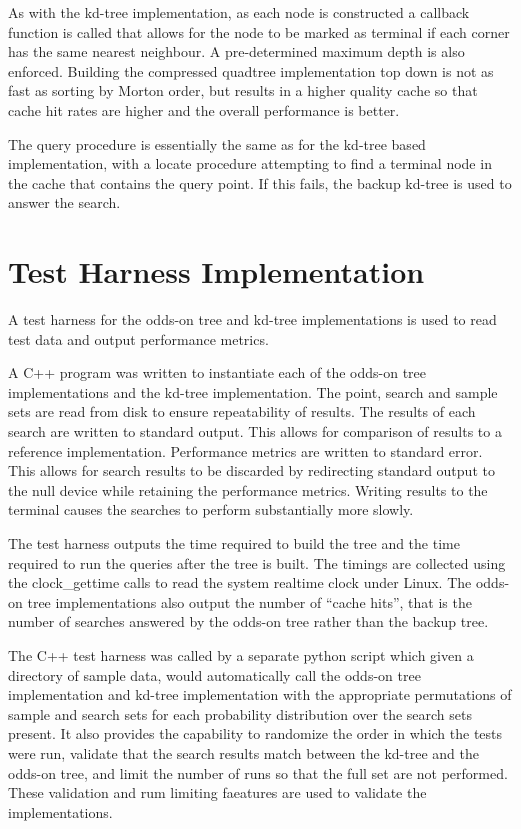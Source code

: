 \documentclass[mcs]{scsthesis}
\begin{document}
As with the kd-tree implementation, as each node is constructed a callback
function is called that allows for the node to be marked as terminal if each
corner has the same nearest neighbour. A pre-determined maximum depth is also
enforced. Building the compressed quadtree implementation top down is not as
fast as sorting by Morton order, but results in a higher quality cache so that
cache hit rates are higher and the overall performance is better. 

The query procedure is essentially the same as for the kd-tree based
implementation, with a locate procedure attempting to find a terminal node in
the cache that contains the query point. If this fails, the backup kd-tree is
used to answer the search.

\section{Test Harness Implementation}

A test harness for the odds-on tree and kd-tree implementations is used to
read test data and output performance metrics.

A C++ program was written to instantiate each of the odds-on tree implementations
and the kd-tree implementation. The point, search and sample sets are read from
disk to ensure repeatability of results. The results of each search are written
to standard output. This allows for comparison of results to a reference
implementation. Performance metrics are written to standard error. This allows
for search results to be discarded by redirecting standard output to the null
device while retaining the performance metrics. Writing results to the terminal
causes the searches to perform substantially more slowly.

The test harness outputs the time required to build the tree and the time
required to run the queries after the tree is built. The timings are collected
using the clock\_gettime calls to read the system realtime clock under Linux.
The odds-on tree implementations also output the number of ``cache hits'', that
is the number of searches answered by the odds-on tree rather than the backup
tree.

The C++ test harness was called by a separate python script which given a
directory of sample data, would automatically call the odds-on tree
implementation and kd-tree implementation with the appropriate permutations of
sample and search sets for each probability distribution over the search sets
present. It also provides the capability to randomize the order in which the
tests were run, validate that the search results match between the kd-tree and
the odds-on tree, and limit the number of runs so that the full set are not
performed. These validation and rum limiting faeatures are used to validate the
implementations.
\end{document}
